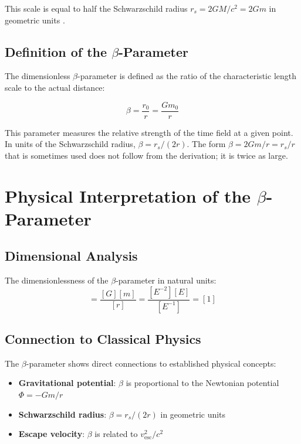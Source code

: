 	This scale is equal to half the Schwarzschild radius $r_s = 2GM/c^2 = 2Gm$ in geometric units \citep{misner1973,carroll2004}.
	
	\subsection{Definition of the $\beta$-Parameter}
	\label{subsec:beta_definition}
	
	The dimensionless $\beta$-parameter is defined as the ratio of the characteristic length scale to the actual distance:
	
	\begin{equation}
		\boxed{\beta = \frac{r_0}{r} = \frac{G m_0}{r}}
	\end{equation}
	
	This parameter measures the relative strength of the time field at a given point. In units of the Schwarzschild radius, $\beta = r_s/(2r)$. The form $\beta = 2Gm/r = r_s/r$ that is sometimes used does not follow from the derivation; it is twice as large.
	
	\section{Physical Interpretation of the $\beta$-Parameter}
	\label{sec:physical_interpretation}
	
	\subsection{Dimensional Analysis}
	\label{subsec:dimensional_analysis}
	
	The dimensionlessness of the $\beta$-parameter in natural units:
	\begin{equation}
		[\beta] = \frac{[G][m]}{[r]} = \frac{[E^{-2}][E]}{[E^{-1}]} = [1]
	\end{equation}
	
	\subsection{Connection to Classical Physics}
	\label{subsec:classical_connection}
	
	The $\beta$-parameter shows direct connections to established physical concepts:
	
	\begin{itemize}
		\item \textbf{Gravitational potential}: $\beta$ is proportional to the Newtonian potential $\Phi = -Gm/r$
		\item \textbf{Schwarzschild radius}: $\beta = r_s/(2r)$ in geometric units
		\item \textbf{Escape velocity}: $\beta$ is related to $v_{\text{esc}}^2/c^2$
	\end{itemize}
	

